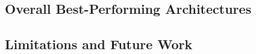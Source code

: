\documentclass{article}
\begin{document}
\subsection{Overall Best-Performing Architectures}


\subsection{Limitations and Future Work}





\end{document}

